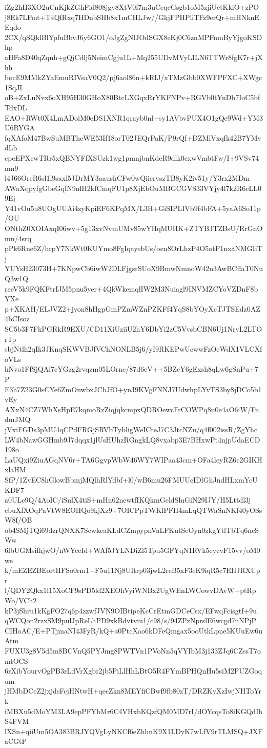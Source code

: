 iZg2hH3XO2uCnKjkZGhFid808jgy8XtV0f7m3uCeqeGsgb1oM5zjiUetKkiO+zPO
j8Ek7LFmt+T4QfRxq7HDnbSHb8x1mCHLJw//GkjFPHPliTFz9erQr+mHNknEEqdo
2CX/qSQklBlYpfuBbvJ6y6GO1/oJgZgNlJOdSGX8eKj0C6znMPFnmByYjgoKSDhp
aHFa8D40qZqnh+gQjCdlj5NeimCgju1L+Mq255UDvMVyLILN6TTWr8fgK7r+jXhh
bocE9MMkZYaEmuRIVsaV0Q2/pj6aol86n+kRIJ/xTMzGbb0XWFPFXC+XWgc1SqJI
oB+ZxLuNvx6oXH95H30GHoX80BtcLXGqxRrYKFNPv+RGVb0tYnDb7IoC5bfTdxDL
EAO+RWt0X4LmADoiM0eDS1XNR1qrayb0nl+sy1AVbvPUX4O1gQe9Wd+YM3U6RYGA
fqXAfoM47BwSuMBTheWE53If18orT02JEQrPaK/P9rQf+DZMlVxqfk42B7YMvdLb
cpeEPXcwTRr5xQBNYFfXSUzk1wg1pmnjbnKdeR9dlk0cxwVmbtFw/I+9VSv74mn9
l4J66OreR6sl1l9saxl5JDrMY3aaushCFw0wQiicrvszTB8yK2iv51y/Y3rx2MDm
AWaXqpyfgGbeGqfN9nlH2kfCmqFU1p8XjEbOuMBGCGVS33VYjy4l7k2R6eLL09Ej
Y41vOu5u8UOgUUAi4zyKpiEF6KPqMX/L3H+GiSIPLIVb9f4bFA+5yaA6So11p/OU
ONthZ0XOIAxqI06wv+5g13xvNvmUMv85wYHqMUHK+ZTYBJTZBsU/RrGnOmn/4srq
pPk6Rne6Z/hrpY7NkWt0KUYmo8FgIqayebUs/oen8OrLhzP4O5atP1nxaNMGIiTj
YUYsH23073H+7KNpwCb6iwW2DLFjgsrSUoX9BmwNmnoW42u3AwBCffaT0NuQ3w1Q
reeV5k9FQKFtrIJM5pnu5yer+4QkWkemqlIW2M3Nuiagl9INVMZCYoVZDnF8bYXe
p+XKAH/ELJVZ2+jyon8hHgpGmPZmWZnPZKFf4YqS8bYOyXcTJTSEdz0AZ4bCIsoz
SC5b3F7FkPGRkR9EXU/CD11XiUziiU2hY6DbYi2zC5VvsbCBN6Uj1NryL2LTOrTp
sbjNtlh2qIk3JKnqSKWVBJfVChNONLB5j6/yI9RKEPwUcwwFzOeWdX1VLCXfoVLs
hNvo1FfSjQAl7eYGzg2rvqzm05LOrne/87d6cV++5BZcY6gExsh8qLw6gSnPu+7P
E3h7Z23G0sCYe6ZmOnwbxJCbJfO+ynJ9KVgFNNJ7UdwhpLYvTS3by8jDCo5b1vEy
AXxN4CZ7WhXsHpE7kqmoRzZiqjqkcmpxQDROewcFrCOWPq8u0e4aO6iW/FndmJMQ
jVxiFGDs3pMU4qCPdFRGjSRVbTybligWeICteJ7C3JtcNZu/q4f002issR/ZgYhc
LW4bNawGGHmb9J7dqqx1jlUsHUhzRGngkLQ8vxabp3E7BHxwPt4njpUdaECD198o
LaUQxi9ZiuAGqNV6r+TA6GgvpWbW46WY7WIPaa43cm+OFa4lcyRZ6c2GIKHxlaHM
SfP/1ZvEC8hGlowBbmjMQlhRlYdbf+l0/wB6mu26FMUUcIDlGhJndHLxmYcUKDF7
a0ULe9Q/4AoIC/iSnlX4tiS+mHn62newtfIKQkmGcldSluGiN29IJY/H5Lttdl3j
cbuXfXOqPaVtW8EOHQo9kjXz9+7OICPpTWKlPFH4mLqQTWaSnNKf40yOSsW8f/OB
ob4SMjTQi69dzrQNXK7ScwkeaKLdCZmpypnVaLFKutSeOyn0zkgYtlTbTq6ncSWw
6lbUGMsifhjwO/nWYceId+WAf5JYLNDiZl5Tpu5GFYqN1RVk5eycvF15vv/oM0we
k/mEZEZBEortHFSo0rm1+F5u11Nj8UItrp03jwL2reB5xF3eK9iqR5c7EHJRXUpr
l/QDY2Qkx1l15XoCF9sPD5ld2XEOhVyiWNBx2UgWEnLWCowvDAvW+ptRpWo/VCh2
kP3jShru1kKgFO27q6p4zzwfJVN9OIBtipeKcCrEtmGDCeCsx/EFwqFcisgtf+9u
qWCQon2rzxSM9pulJpReLhPD9xkBdvtviu1/c98/s/94ZPzNprslE6wcgd7nNPjP
CIHoAC/E+PTjmaNI43FyR/kQ+a0PtcXao6kDFeQmgax5ooUtkLpne5KUuEw6uAtm
FUXU3g8V5d5m8BCVnQ5PYJmg8PWTVn1PVoNn5qVYIbM3j133ZJq6CZssT7omtOCS
6rXibYourvOgPB3rLdVrXgbr2jb5PiLlHhLBtO5R4FYmBPHQnHu5siM2PUZGoqum
jHMbDCeZ2jxjdsFcjHNtwH+qecZkn8MEYfiCBwf9fb80zT/DRZKyXzIwjNHToYrk
iMBXu5dMoYM3LA9epPFYbMr6C4VHxbKQzfQM0MD7rI/dOYcqsTo8iKGQdIhS4FVM
lXSn+qiiUm5OA383BRJYQVgLyNKCf6eZhhnK9X1LDyK7wLfV9rTLMSQ+JXFaCGtP
